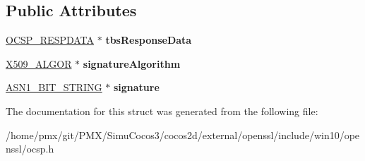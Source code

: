 \subsection*{Public Attributes}
\begin{DoxyCompactItemize}
\item 
\mbox{\label{structocsp__basic__response__st_a09c6bafbf175745b5919a3e15055354c}} 
\hyperlink{structocsp__response__data__st}{O\+C\+S\+P\+\_\+\+R\+E\+S\+P\+D\+A\+TA} $\ast$ {\bfseries tbs\+Response\+Data}
\item 
\mbox{\label{structocsp__basic__response__st_aaf4560b99757f89823b63d97c5e5487b}} 
\hyperlink{structX509__algor__st}{X509\+\_\+\+A\+L\+G\+OR} $\ast$ {\bfseries signature\+Algorithm}
\item 
\mbox{\label{structocsp__basic__response__st_afce61e2065685eaea0d539e366fe3cee}} 
\hyperlink{structasn1__string__st}{A\+S\+N1\+\_\+\+B\+I\+T\+\_\+\+S\+T\+R\+I\+NG} $\ast$ {\bfseries signature}
\end{DoxyCompactItemize}


The documentation for this struct was generated from the following file\+:\begin{DoxyCompactItemize}
\item 
/home/pmx/git/\+P\+M\+X/\+Simu\+Cocos3/cocos2d/external/openssl/include/win10/openssl/ocsp.\+h\end{DoxyCompactItemize}
